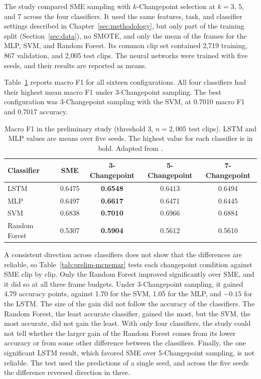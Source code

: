 The study compared SME sampling with $k$-Changepoint selection at $k = 3$, 5, and 7 across the four classifiers. It used the same features, task, and classifier settings described in Chapter~\ref{sec:methodology}, but only part of the training split (Section~\ref{sec:data}), no SMOTE, and only the mean of the frames for the MLP, SVM, and Random Forest. Its common clip set contained 2,719 training, 867 validation, and 2,005 test clips. The neural networks were trained with five seeds, and their results are reported as means.

Table~\ref{tab:prelim-f1} reports macro F1 for all sixteen configurations. All four classifiers had their highest mean macro F1 under 3-Changepoint sampling. The best configuration was 3-Changepoint sampling with the SVM, at 0.7010 macro F1 and 0.7017 accuracy.

\begin{table}[t]
   \centering
   \caption[Macro F1 in the preliminary study]{Macro F1 in the preliminary study (threshold 3, $n = 2{,}005$ test clips). LSTM and MLP values are means over five seeds. The highest value for each classifier is in bold. Adapted from .}
   \label{tab:prelim-f1}
   \begin{tabular}{lcccc}
      \toprule
      Classifier & SME & 3-Changepoint & 5-Changepoint & 7-Changepoint \\
      \midrule
      LSTM & 0.6475 & \textbf{0.6548} & 0.6413 & 0.6494 \\
      MLP & 0.6497 & \textbf{0.6617} & 0.6471 & 0.6445 \\
      SVM & 0.6838 & \textbf{0.7010} & 0.6966 & 0.6884 \\
      Random Forest & 0.5307 & \textbf{0.5904} & 0.5612 & 0.5610 \\
      \bottomrule
   \end{tabular}
\end{table}

A consistent direction across classifiers does not show that the differences are reliable, so Table~\ref{tab:prelim-mcnemar} tests each changepoint condition against SME clip by clip. Only the Random Forest improved significantly over SME, and it did so at all three frame budgets. Under 3-Changepoint sampling, it gained 4.79 accuracy points, against 1.70 for the SVM, 1.05 for the MLP, and $-0.15$ for the LSTM. The size of the gain did not follow the accuracy of the classifiers. The Random Forest, the least accurate classifier, gained the most, but the SVM, the most accurate, did not gain the least. With only four classifiers, the study could not tell whether the larger gain of the Random Forest comes from its lower accuracy or from some other difference between the classifiers. Finally, the one significant LSTM result, which favored SME over 5-Changepoint sampling, is not reliable. The test used the predictions of a single seed, and across the five seeds the difference reversed direction in three.

